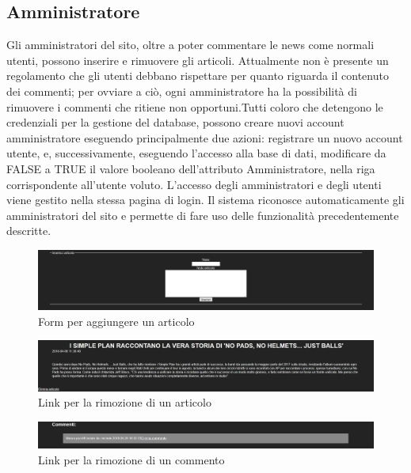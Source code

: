 \documentclass[10pt, a4paper]{article}
\begin{document}
\subsection{Amministratore}
Gli amministratori del sito, oltre a poter commentare le news come normali utenti, possono inserire e rimuovere gli articoli. Attualmente non è presente un regolamento che gli utenti debbano rispettare per quanto riguarda il contenuto dei commenti; per ovviare a ciò, ogni amministratore ha la possibilità di rimuovere i commenti che ritiene non opportuni.Tutti coloro che detengono le credenziali per la gestione del database, possono creare nuovi account amministratore eseguendo principalmente due azioni: registrare un nuovo account utente, e, successivamente, eseguendo l’accesso alla base di dati, modificare da FALSE a TRUE il valore booleano dell'attributo Amministratore, nella riga corrispondente all’utente voluto. L’accesso degli amministratori e degli utenti viene gestito nella stessa pagina di login. Il sistema riconosce automaticamente gli amministratori del sito e permette di fare uso delle funzionalità precedentemente descritte. 
\begin{figure}[h!]
 \centering
  \includegraphics[width=1\textwidth]{Images/aggiungiarticolo.png}
  \caption{Form per aggiungere un articolo}
  \label{fig:aggiungiarticolo}
\end{figure}

\begin{figure}[h!]
 \centering
  \includegraphics[width=1\textwidth]{Images/rimuoviarticolo.png}
  \caption{Link per la rimozione di un articolo}
  \label{fig:rimuoviarticolo}
\end{figure}

\begin{figure}[h!]
 \centering
  \includegraphics[width=1\textwidth]{Images/rimuovicommento.png}
  \caption{Link per la rimozione di un commento}
  \label{fig:rimuovicommento}
\end{figure}
\end{document}
